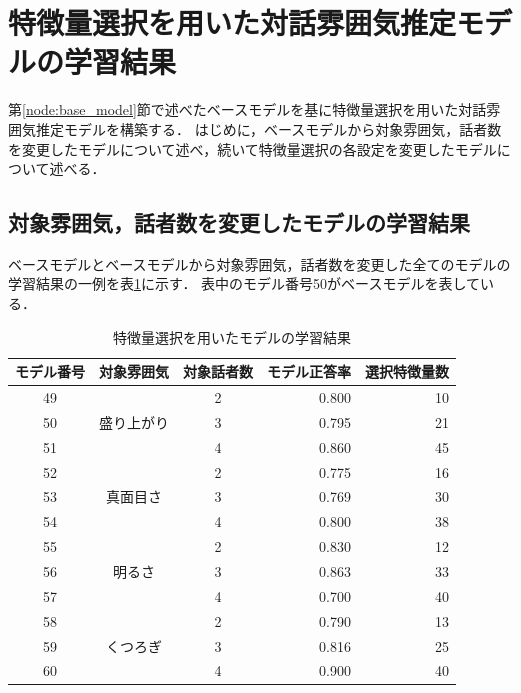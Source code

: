 \section{特徴量選択を用いた対話雰囲気推定モデルの学習結果\label{node:learning_result_with_ga}}

第\ref{node:base_model}節で述べたベースモデルを基に特徴量選択を用いた対話雰囲気推定モデルを構築する．
はじめに，ベースモデルから対象雰囲気，話者数を変更したモデルについて述べ，続いて特徴量選択の各設定を変更したモデルについて述べる．

\subsection{対象雰囲気，話者数を変更したモデルの学習結果\label{item:learning_result_with_ga_change_targets}}

ベースモデルとベースモデルから対象雰囲気，話者数を変更した全てのモデルの学習結果の一例を表\ref{tab:learn_result_with_ga}に示す．
表中のモデル番号50がベースモデルを表している．

\begin{table}[t]
    \caption{特徴量選択を用いたモデルの学習結果}
    \centering
    \begin{tabular}{|c|c|c|r|r|}
        \hline
        モデル番号 & 対象雰囲気 & 対象話者数 & モデル正答率 & 選択特徴量数 \\
        \hline\hline
        49 & \multirow{3}{*}{盛り上がり} & 2 & 0.800 & 10 \\ \cline{1-1}\cline{3-5}
        50 & & 3 & 0.795 & 21 \\ \cline{1-1}\cline{3-5}
        51 & & 4 & 0.860 & 45 \\ \hline
        52 & \multirow{3}{*}{真面目さ} & 2 & 0.775 & 16 \\ \cline{1-1}\cline{3-5}
        53 & & 3 & 0.769 & 30 \\ \cline{1-1}\cline{3-5}
        54 & & 4 & 0.800 & 38 \\ \hline
        55 & \multirow{3}{*}{明るさ} & 2 & 0.830 & 12 \\ \cline{1-1}\cline{3-5}
        56 & & 3 & 0.863 & 33 \\ \cline{1-1}\cline{3-5}
        57 & & 4 & 0.700 & 40 \\ \hline
        58 & \multirow{3}{*}{くつろぎ} & 2 & 0.790 & 13 \\ \cline{1-1}\cline{3-5}
        59 & & 3 & 0.816 & 25 \\ \cline{1-1}\cline{3-5}
        60 & & 4 & 0.900 & 40 \\ \hline
    \end{tabular}
    \label{tab:learn_result_with_ga}
\end{table}

